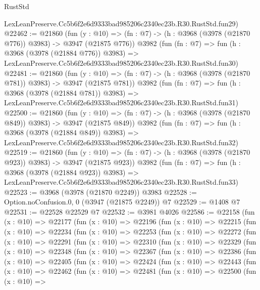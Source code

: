 \begin{lexlean}{RustStd}
\begin{coremodule}
    LexLeanPreserve.Cc5b6f2e6d9333bad985206c2340ec23b.R30.RustStd.fun29)
@22462 := @21860
    (fun (y : @10) => (fn : @7) -> (h : @3968 (@3978 (@21870 @776)) @3983) -> @3947 (@21875 @776))
    @3982
    (fun (fn : @7) =>
    fun (h : @3968 (@3978 (@21884 @776)) @3983) =>
    LexLeanPreserve.Cc5b6f2e6d9333bad985206c2340ec23b.R30.RustStd.fun30)
@22481 := @21860
    (fun (y : @10) => (fn : @7) -> (h : @3968 (@3978 (@21870 @781)) @3983) -> @3947 (@21875 @781))
    @3982
    (fun (fn : @7) =>
    fun (h : @3968 (@3978 (@21884 @781)) @3983) =>
    LexLeanPreserve.Cc5b6f2e6d9333bad985206c2340ec23b.R30.RustStd.fun31)
@22500 := @21860
    (fun (y : @10) => (fn : @7) -> (h : @3968 (@3978 (@21870 @849)) @3983) -> @3947 (@21875 @849))
    @3982
    (fun (fn : @7) =>
    fun (h : @3968 (@3978 (@21884 @849)) @3983) =>
    LexLeanPreserve.Cc5b6f2e6d9333bad985206c2340ec23b.R30.RustStd.fun32)
@22519 := @21860
    (fun (y : @10) => (fn : @7) -> (h : @3968 (@3978 (@21870 @923)) @3983) -> @3947 (@21875 @923))
    @3982
    (fun (fn : @7) =>
    fun (h : @3968 (@3978 (@21884 @923)) @3983) =>
    LexLeanPreserve.Cc5b6f2e6d9333bad985206c2340ec23b.R30.RustStd.fun33)
@22523 := @3968 (@3978 (@21870 @2249)) @3983
@22528 := Option.noConfusion.{0, 0} (@3947 (@21875 @2249)) @7
@22529 := @1408 @7
@22531 := @22528 @22529 @7
@22532 := @3981 @4026
@22586 := @22158
    (fun (x : @10) =>
    @22177
      (fun (x : @10) =>
      @22196
        (fun (x : @10) =>
        @22215
          (fun (x : @10) =>
          @22234
            (fun (x : @10) =>
            @22253
              (fun (x : @10) =>
              @22272
                (fun (x : @10) =>
                @22291
                  (fun (x : @10) =>
                  @22310
                    (fun (x : @10) =>
                    @22329
                      (fun (x : @10) =>
                      @22348
                        (fun (x : @10) =>
                        @22367
                          (fun (x : @10) =>
                          @22386
                            (fun (x : @10) =>
                            @22405
                              (fun (x : @10) =>
                              @22424
                                (fun (x : @10) =>
                                @22443
                                  (fun (x : @10) =>
                                  @22462
                                    (fun (x : @10) =>
                                    @22481
                                      (fun (x : @10) =>
                                      @22500
                                        (fun (x : @10) =>

\end{coremodule}
\end{lexlean}
